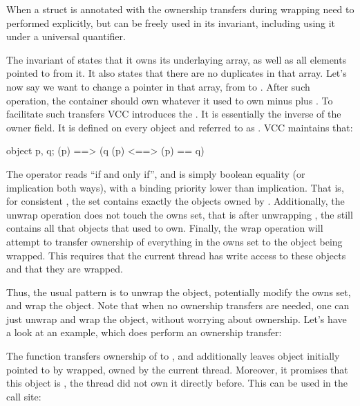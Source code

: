 When a struct is annotated with  the ownership transfers
during wrapping need to performed explicitly, but  can
be freely used in its invariant, including using it under a universal
quantifier.


\noindent
The invariant of  states that it owns its underlaying array,
as well as all elements pointed to from it.
It also states that there are no duplicates in that array.
Let's now say we want to change a pointer in that array,
from  to .
After such operation, the container should own whatever it used
to own minus  plus .
To facilitate such transfers VCC introduces the .
It is essentially the inverse of the owner field.
It is defined on every object  and referred to as .
VCC maintains that:
\begin{VCC}
\forall object p, q; \consistent(p) ==> 
  (q \in \owns(p) <==> \owner(p) == q)
\end{VCC}
The operator \vcc{<==>} reads ``if and only if'', and is simply boolean
equality (or implication both ways), with a binding priority lower than implication.
That is, for consistent , the set  contains exactly
the objects owned by .
Additionally, the unwrap operation does not touch the owns set,
that is after unwrapping , the  still contains
all that objects that  used to own.
Finally, the wrap operation will attempt to transfer ownership
of everything in the owns set to the object being wrapped.
This requires that the current thread has write access to these objects
and that they are wrapped.

Thus, the usual pattern is to unwrap the object, potentially modify the owns
set, and wrap the object.
Note that when no ownership transfers are needed, one can just unwrap
and wrap the object, without worrying about ownership.
Let's have a look at an example, which does perform an ownership transfer:


\noindent
The  function transfers ownership of  to ,
and additionally leaves object initially pointed to by 
wrapped, \ie owned by the current thread.
Moreover, it promises that this object is , \ie the thread did not own
it directly before.
This can be used in the call site:

